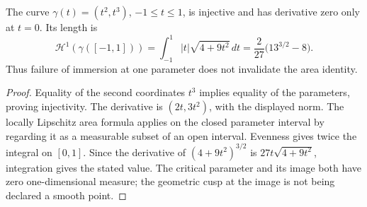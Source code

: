 \begin{example}\label{ex:area-real-cusp-length}
The curve $\gamma(t)=(t^2,t^3)$, $-1\leq t\leq1$, is injective and has derivative zero only at $t=0$. Its length is
\[
 \mathcal H^1(\gamma([-1,1]))
 =\int_{-1}^1|t|\sqrt{4+9t^2}\,dt
 =\frac{2}{27}\bigl(13^{3/2}-8\bigr).
\]
Thus failure of immersion at one parameter does not invalidate the area identity.
\end{example}
\begin{proof}
Equality of the second coordinates $t^3$ implies equality of the parameters, proving injectivity. The derivative is $(2t,3t^2)$, with the displayed norm. The locally Lipschitz area formula applies on the closed parameter interval by regarding it as a measurable subset of an open interval. Evenness gives twice the integral on $[0,1]$. Since the derivative of $(4+9t^2)^{3/2}$ is $27t\sqrt{4+9t^2}$, integration gives the stated value. The critical parameter and its image both have zero one-dimensional measure; the geometric cusp at the image is not being declared a smooth point.
\end{proof}

